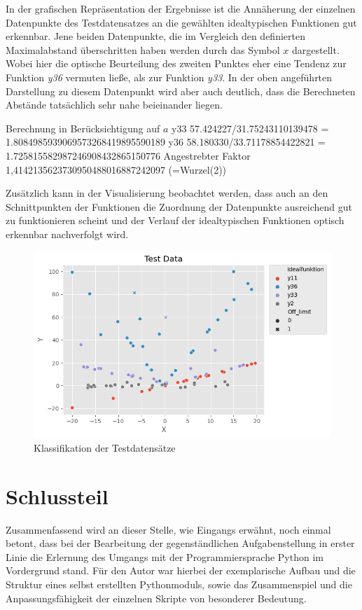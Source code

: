 In der grafischen Repräsentation der Ergebnisse ist die Annäherung der einzelnen Datenpunkte des Testdatensatzes an die gewählten idealtypischen Funktionen gut erkennbar. Jene beiden Datenpunkte, die im Vergleich den definierten Maximalabstand überschritten haben werden durch das Symbol $x$ dargestellt. Wobei hier die optische Beurteilung des zweiten Punktes eher eine Tendenz zur Funktion \emph{y36} vermuten ließe, als zur Funktion \emph{y33}. In der oben angeführten Darstellung zu diesem Datenpunkt wird aber auch deutlich, dass die Berechneten Abstände tatsächlich sehr nahe beieinander liegen.

Berechnung in Berücksichtigung auf $a$
y33 57.424227/31.75243110139478 = 1.8084985939069573268419895590189
y36  58.180330/33.71178854422821 = 1.725815582987246908432865150776
Angestrebter Faktor 1,4142135623730950488016887242097 (=Wurzel(2))

Zusätzlich kann in der Visualisierung beobachtet werden, dass auch an den Schnittpunkten der Funktionen die Zuordnung der Datenpunkte ausreichend gut zu funktionieren scheint und der Verlauf der idealtypischen Funktionen optisch erkennbar nachverfolgt wird.


\begin{figure}[h]
\centering
\includegraphics[width=13cm]{../output/figures/test.png}
\caption{Klassifikation der Testdatensätze \cite{Gage:18}}\label{fig:test}
\end{figure}


\chapter{Schlussteil}

Zusammenfassend wird an dieser Stelle, wie Eingangs erwähnt, noch einmal betont, dass bei der Bearbeitung der gegenständlichen Aufgabenstellung in erster Linie die Erlernung des Umgangs mit der Programmiersprache Python im Vordergrund stand. Für den Autor war hierbei der exemplarische Aufbau und die Struktur eines selbst erstellten Pythonmoduls, sowie das Zusammenspiel und die Anpassungsfähigkeit der einzelnen Skripte von besonderer Bedeutung.

